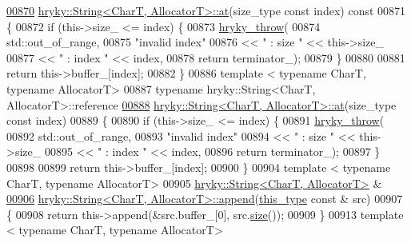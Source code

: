 \begin{DoxyCode}
\hypertarget{string_8h_source_l00870}{}\hyperlink{classhryky_1_1_string_a94674af895596884bb7f365e922afb9d}{00870} \hyperlink{classhryky_1_1_string}{hryky::String<CharT, AllocatorT>::at}(size\_type \textcolor{keyword}{const} index)\textcolor{keyword}{ const}
00871 \textcolor{keyword}{}\{
00872     \textcolor{keywordflow}{if} (this->size\_ <= index) \{
00873         \hyperlink{debug__common_8h_af50606eac4009921527ddcaed392b2c2}{hryky_throw}(
00874             std::out\_of\_range,
00875             \textcolor{stringliteral}{"invalid index"}
00876             << \textcolor{stringliteral}{" : size "} << this->size\_
00877             << \textcolor{stringliteral}{" : index "} << index,
00878             \textcolor{keywordflow}{return} terminator\_);
00879     \}
00880     
00881     \textcolor{keywordflow}{return} this->buffer\_[index];
00882 \}
00886 \textcolor{keyword}{template} < \textcolor{keyword}{typename} CharT, \textcolor{keyword}{typename} AllocatorT>
00887 \textcolor{keyword}{typename} hryky::String<CharT, AllocatorT>::reference
\hypertarget{string_8h_source_l00888}{}\hyperlink{classhryky_1_1_string_a73cc0252b25bad7447d79d405a2d92ba}{00888} \hyperlink{classhryky_1_1_string}{hryky::String<CharT, AllocatorT>::at}(size\_type \textcolor{keyword}{const} index)
00889 \{
00890     \textcolor{keywordflow}{if} (this->size\_ <= index) \{
00891         \hyperlink{debug__common_8h_af50606eac4009921527ddcaed392b2c2}{hryky_throw}(
00892             std::out\_of\_range,
00893             \textcolor{stringliteral}{"invalid index"}
00894             << \textcolor{stringliteral}{" : size "} << this->size\_
00895             << \textcolor{stringliteral}{" : index "} << index,
00896             \textcolor{keywordflow}{return} terminator\_);
00897     \}
00898     
00899     \textcolor{keywordflow}{return} this->buffer\_[index];
00900 \}
00904 \textcolor{keyword}{template} < \textcolor{keyword}{typename} CharT, \textcolor{keyword}{typename} AllocatorT>
00905 \hyperlink{classhryky_1_1_string}{hryky::String<CharT, AllocatorT>} &
\hypertarget{string_8h_source_l00906}{}\hyperlink{classhryky_1_1_string_a7b717e6b7a107d6fdc7c0371fa71fcb8}{00906} \hyperlink{classhryky_1_1_string}{hryky::String<CharT, AllocatorT>::append}(\hyperlink{classhryky_1_1_string}{this_type} \textcolor{keyword}{const} & src)
00907 \{
00908     \textcolor{keywordflow}{return} this->append(&src.buffer\_[0], src.\hyperlink{classhryky_1_1_string_a9db0f71dce7b2de86a54ab5323759265}{size}());
00909 \}
00913 \textcolor{keyword}{template} < \textcolor{keyword}{typename} CharT, \textcolor{keyword}{typename} AllocatorT>

\end{DoxyCode}
